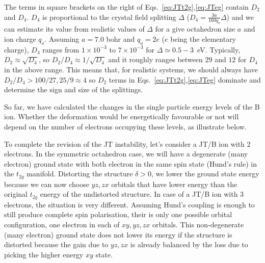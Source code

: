 \documentclass[a4paper,prb,twocolumn]{revtex4-1}  %
\begin{document}
The terms in square brackets on the right of Eqs.~\ref{eq:JTt2g},\ref{eq:JTeg}
contain $D_2$ and $D_4$. 
$D_4$ is proportional to the crystal field splitting $\Delta$ 
($D_4=\frac{3a}{160q_o} \Delta$) and 
we can estimate its value from realistic values of $\Delta$ for a give octahedron size $a$ and ion charge $q_o$. 
Assuming $a=7.0$ bohr and $q_o=2e$ ($e$ being the elementary charge),
$D_4$ ranges from $1 \times 10^{-3}$ to  $7 \times 10^{-3}$
for $\Delta \simeq 0.5-3$~eV.
Typically, ${D_{2}\approx \sqrt{D_{4}}}$,
so $D_{2}/D_{4} \approx 1/\sqrt{D_{4}}$
and it roughly ranges between $29$ and $12$ for $D_4$ in the above range.
This means that, for realistic systems, 
we should always have $D_{2}/D_{4} > 100/27, 25/9 \approx 4$
so 
$D_{2}$ terms in 
Eqs.~\ref{eq:JTt2g},\ref{eq:JTeg}
dominate and determine the sign and size of the splittings.


So far, we have calculated the changes in the single particle energy levels of the B ion. 
Whether the deformation would be energetically favourable 
or not will depend on the number of electrons occupying these levels,
as illustrate below.


To complete the revision of the JT instability,
let's consider %
a JT/B ion with $2$ electrons.
In the symmetric octahedron case, 
we will have a degenerate (many electron) ground state 
with both electron in the same spin state (Hund's rule) in the $t_{2g}$ manifold.
Distorting the structure $\delta>0$, we lower the ground state energy because 
we can now choose $yz,zx$ orbitals that have lower energy than the original $t_{2g}$ energy of the undistorted structure.
In case of a JT/B ion with $3$ electrons, the situation is very different.
Assuming Hund's coupling is enough to still produce complete spin polarisation,
their is only one possible orbital configuration, one electron in each of $xy,yz,zx$ orbitals.
This non-degenerate (many electron) ground state
does not lower its energy if the structure is distorted 
because the gain due to $yz,zx$ is already balanced by the loss due to picking the higher energy $xy$ state.
\end{document}

